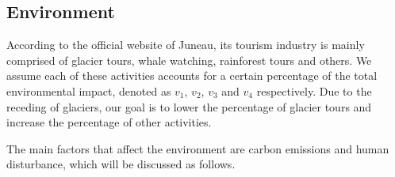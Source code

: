 \subsection{Environment}

According to the official website of Juneau, its tourism industry is 
mainly comprised of glacier tours, whale watching, rainforest tours and others.
We assume each of these activities accounts for a certain percentage of the total environmental impact,
denoted as $v_1$, $v_2$, $v_3$ and $v_4$ respectively. Due to the receding of glaciers,
our goal is to lower the percentage of glacier tours and increase the percentage of other activities.

The main factors that affect the environment are carbon emissions and human disturbance, which will be discussed as follows.